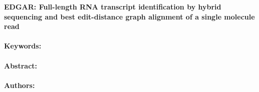 \noindent
\large {\bf EDGAR: Full-length RNA transcript identification by hybrid sequencing and best edit-distance graph alignment of a single molecule read} 


\normalsize 


\noindent \paragraph{Keywords:} 

\noindent \paragraph{Abstract:} 



\noindent \paragraph{Authors:} 

